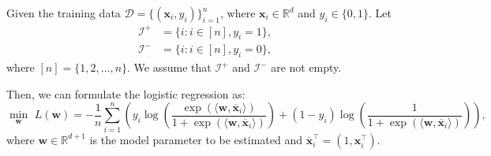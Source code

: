 \documentclass[11pt,letter,notitlepage]{article}
\begin{document}
\begin{exercise}
Given the training data $\mathcal{D}=\{ (\textbf{x}_i,y_i) \}_{i=1}^n$, where $\textbf{x}_i \in \mathbb{R}^d$ and $y_i \in \{ 0,1 \}$. Let
\begin{align*}
    \mathcal{I}^+&=\{i:i\in[n],y_i=1\},\\
    \mathcal{I}^-&=\{i:i\in[n],y_i=0\},
\end{align*}
where $[n]=\{1,2,\ldots,n\}$. We assume that $\mathcal{I}^+$ and $\mathcal{I}^-$ are not empty.

Then, we can formulate the logistic regression as:
	\begin{equation}\label{prob:logistic}
	\min_{\textbf{w}}\,\,L(\textbf{w})=-\frac{1}{n}\sum_{i=1}^n \left( y_i \log \left( \frac{\exp(\langle \textbf{w},  \overline{\mathbf{x}}_i \rangle)}{1+\exp(\langle \textbf{w},  \overline{\mathbf{x}}_i \rangle) } \right) + (1-y_i)\log \left( \frac{1}{1+\exp(\langle \textbf{w},  \overline{\mathbf{x}}_i \rangle)} \right) \right),
	\end{equation}
	where $\mathbf{w} \in \mathbb{R}^{d+1}$ is the model parameter to be estimated and $ \overline{\mathbf{x}}_i^{\top} = (1,\mathbf{x}_i^{\top}) $.
	
	


\end{exercise}
\end{document}
